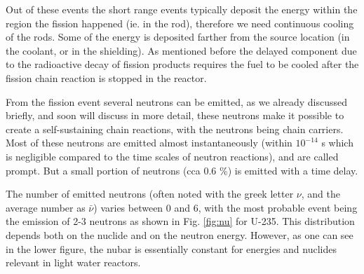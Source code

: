 Out of these events the short range events typically deposit the energy within the region the fission happened (ie. in the rod), therefore we need continuous cooling of the rods. Some of the energy is deposited farther from the source location (in the coolant, or in the shielding). As mentioned before the delayed component due to the radioactive decay of fission products requires the fuel to be cooled after the fission chain reaction is stopped in the reactor.

From the fission event several neutrons can be emitted, as we already discussed briefly, and soon will discuss in more detail, these neutrons make it possible to create a self-sustaining chain reactions, with the neutrons being chain carriers. Most of these neutrons are emitted almost instantaneously (within $10^{-14}$ s which is negligible compared to the time scales of neutron reactions), and are called prompt. But a small portion of neutrons (cca 0.6 \%) is emitted with a time delay.

The number of emitted neutrons (often noted with the greek letter $\nu$, and the average number as $\bar\nu$) varies between 0 and 6, with the most probable event being the emission of 2-3 neutrons as shown in Fig. \ref{fig:nu} for U-235. This distribution depends both on the nuclide and on the neutron energy. However, as one can see in the lower figure, the nubar is essentially constant for energies and nuclides relevant in light water reactors.


